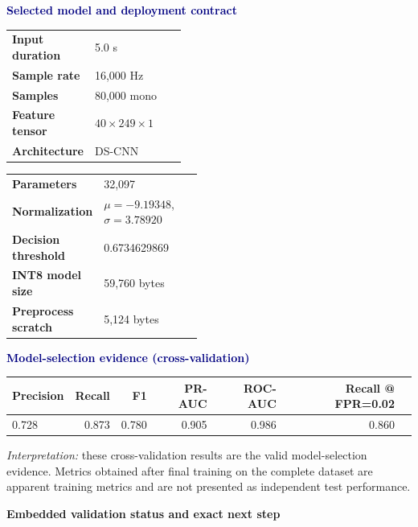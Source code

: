\documentclass[10pt,a4paper]{article}
\newcommand{\boxhead}[1]{\textcolor{navy}{\textbf{#1}}}
\begin{document}
\boxhead{Selected model and deployment contract}
\begin{center}
\begin{minipage}[t]{0.48\linewidth}
\begin{tabularx}{\linewidth}{>{\bfseries}p{0.43\linewidth}X}
Input duration & 5.0 s \\
Sample rate & 16,000 Hz \\
Samples & 80,000 mono \\
Feature tensor & $40\times249\times1$ \\
Architecture & DS-CNN \\
\end{tabularx}
\end{minipage}\hfill
\begin{minipage}[t]{0.48\linewidth}
\begin{tabularx}{\linewidth}{>{\bfseries}p{0.47\linewidth}X}
Parameters & 32,097 \\
Normalization & $\mu=-9.19348$, $\sigma=3.78920$ \\
Decision threshold & 0.6734629869 \\
INT8 model size & 59,760 bytes \\
Preprocess scratch & 5,124 bytes \\
\end{tabularx}
\end{minipage}
\end{center}

\vspace{3pt}
\boxhead{Model-selection evidence (cross-validation)}
\begin{center}
\begin{tabular}{lrrrrrr}
\toprule
Precision & Recall & F1 & PR-AUC & ROC-AUC & Recall @ FPR=0.02 \\
\midrule
0.728 & 0.873 & 0.780 & 0.905 & 0.986 & 0.860 \\
\bottomrule
\end{tabular}
\end{center}
\textit{Interpretation:} these cross-validation results are the valid model-selection evidence. Metrics obtained after final training on the complete dataset are apparent training metrics and are not presented as independent test performance.

\newpage

{\Large\bfseries\color{navy} Embedded validation status and exact next step}\par
\vspace{3pt}
\end{document}
